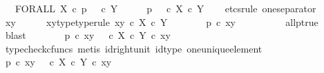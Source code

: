 \begin{isabellebody}
\ \ \ {\isachardoublequoteopen}FORALL\ X\ {\isasymcirc}\isactrlsub c\ p\isactrlsup {\isasymsharp}\ {\isacharequal}{\kern0pt}\ {\isasymt}\ {\isasymcirc}\isactrlsub c\ {\isasymbeta}\isactrlbsub Y\isactrlesub {\isachardoublequoteclose}\isanewline
%
\isadelimproof
%
\endisadelimproof
%
\isatagproof
{}\isamarkupfalse%
\ {\isacharminus}{\kern0pt}\isanewline
\ \ \isamarkupfalse%
\ {\isachardoublequoteopen}p\ {\isacharequal}{\kern0pt}\ {\isasymt}\ {\isasymcirc}\isactrlsub c\ {\isasymbeta}\isactrlbsub X\ {\isasymtimes}\isactrlsub c\ Y\isactrlesub {\isachardoublequoteclose}\isanewline
\ \ \isamarkupfalse%
\ {\isacharparenleft}{\kern0pt}etcs{\isacharunderscore}{\kern0pt}rule\ one{\isacharunderscore}{\kern0pt}separator{\isacharparenright}{\kern0pt}\isanewline
\ \ \ \ \isamarkupfalse%
\ xy\isanewline
\ \ \ \ \isamarkupfalse%
\ xy{\isacharunderscore}{\kern0pt}type{\isacharbrackleft}{\kern0pt}type{\isacharunderscore}{\kern0pt}rule{\isacharbrackright}{\kern0pt}{\isacharcolon}{\kern0pt}\ {\isachardoublequoteopen}xy\ {\isasymin}\isactrlsub c\ X\ {\isasymtimes}\isactrlsub c\ Y{\isachardoublequoteclose}\isanewline
\ \ \ \ \isamarkupfalse%
\ \isamarkupfalse%
\ {\isachardoublequoteopen}p\ {\isasymcirc}\isactrlsub c\ xy\ {\isacharequal}{\kern0pt}\ {\isasymt}{\isachardoublequoteclose}\isanewline
\ \ \ \ \ \ \isamarkupfalse%
\ all{\isacharunderscore}{\kern0pt}p{\isacharunderscore}{\kern0pt}true\ \isamarkupfalse%
\ blast\isanewline
\ \ \ \ \isamarkupfalse%
\ \isamarkupfalse%
\ {\isachardoublequoteopen}p\ {\isasymcirc}\isactrlsub c\ xy\ {\isacharequal}{\kern0pt}\ {\isasymt}\ {\isasymcirc}\isactrlsub c\ {\isacharparenleft}{\kern0pt}{\isasymbeta}\isactrlbsub X\ {\isasymtimes}\isactrlsub c\ Y\isactrlesub \ {\isasymcirc}\isactrlsub c\ xy{\isacharparenright}{\kern0pt}{\isachardoublequoteclose}\isanewline
\ \ \ \ \ \ \isamarkupfalse%
\ {\isacharparenleft}{\kern0pt}typecheck{\isacharunderscore}{\kern0pt}cfuncs{\isacharcomma}{\kern0pt}\ metis\ id{\isacharunderscore}{\kern0pt}right{\isacharunderscore}{\kern0pt}unit{}\ id{\isacharunderscore}{\kern0pt}type\ one{\isacharunderscore}{\kern0pt}unique{\isacharunderscore}{\kern0pt}element{\isacharparenright}{\kern0pt}\isanewline
\ \ \ \ \isamarkupfalse%
\ \isamarkupfalse%
\ {\isachardoublequoteopen}p\ {\isasymcirc}\isactrlsub c\ xy\ {\isacharequal}{\kern0pt}\ {\isacharparenleft}{\kern0pt}{\isasymt}\ {\isasymcirc}\isactrlsub c\ {\isasymbeta}\isactrlbsub X\ {\isasymtimes}\isactrlsub c\ Y\isactrlesub {\isacharparenright}{\kern0pt}\ {\isasymcirc}\isactrlsub c\ xy{\isachardoublequoteclose}\isanewline

\end{isabellebody}
